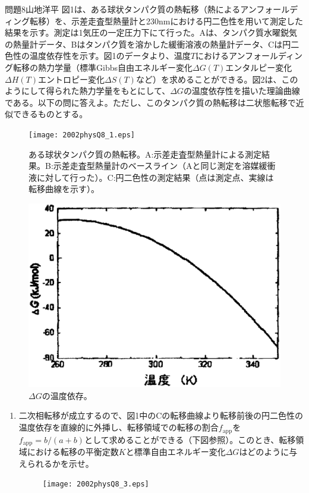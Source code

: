 \documentclass[fleqn]{jbook}
\begin{document}
\begin{question}{問題8}{山地洋平}
図1は、ある球状タンパク質の熱転移（熱によるアンフォールディング転移）を、示差走査型熱量計と230nmにおける円二色性を用いて測定した結果を示す。測定は1気圧の一定圧力下にて行った。Aは、タンパク質水曜鋭気の熱量計データ、Bはタンパク質を溶かした緩衝溶液の熱量計データ、Cは円二色性の温度依存性を示す。図1のデータより、温度$T$におけるアンフォールディング転移の熱力学量（標準Gibbs自由エネルギー変化$\Delta G(T)$エンタルピー変化$\Delta H(T)$エントロピー変化$\Delta S(T)$など）を求めることができる。図2は、このようにして得られた熱力学量をもとにして、$\Delta G$の温度依存性を描いた理論曲線である。以下の問に答えよ。ただし、このタンパク質の熱転移は二状態転移で近似できるものとする。
\begin{figure}[htbp]
\begin{center}
\texttt{[image: 2002physQ8\_1.eps]}
\caption{ある球状タンパク質の熱転移。A:示差走査型熱量計による測定結果。B:示差走査型熱量計のベースライン（Aと同じ測定を溶媒緩衝液に対して行った）。C:円二色性の測定結果（点は測定点、実線は転移曲線を示す）。}
\includegraphics[width=.7\linewidth]{2002phy8q2.eps}
\caption{$\Delta G$の温度依存。}
\end{center}
\end{figure}
\newpage
\begin{enumerate}
\item 二次相転移が成立するので、図1中のCの転移曲線より転移前後の円二色性の温度依存を直線的に外挿し、転移領域での転移の割合$f_{\mathrm{app}}$を
$f_{\mathrm{app}}=b/(a+b)$として求めることができる（下図参照）。このとき、転移領域における転移の平衡定数$K$と標準自由エネルギー変化$\Delta  G$はどのように与えられるかを示せ。
\begin{figure}[htbp]
\begin{center}
\texttt{[image: 2002physQ8\_3.eps]}
\end{center}

\end{figure}
\end{enumerate}
\end{question}
\end{document}
